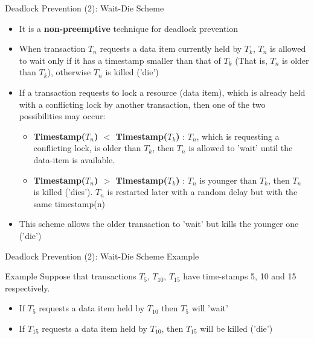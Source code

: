 \documentclass[aspectratio=169, xcolor=dvipsnames]{beamer}
\begin{document}
\begin{frame}{Deadlock Prevention (2): Wait-Die Scheme}
    \begin{itemize}[<+->]
        \item It is a \textbf{non-preemptive} technique for deadlock prevention
        \item When transaction $T_n$ requests a data item currently held by $T_k$, $T_n$ is allowed to wait only if it has a timestamp smaller than that of $T_k$ (That is, $T_n$ is older than $T_k$), otherwise $T_n$ is killed ('die')
        \item If a transaction requests to lock a resource (data item), which is already held with a conflicting lock by another transaction, then one of the two possibilities may occur:
        \begin{itemize}
            \item[$\triangleright$] \textbf{Timestamp($T_n$) $<$ Timestamp($T_k$)} : $T_n$, which is requesting a conflicting lock, is older than $T_k$, then $T_n$ is allowed to 'wait' until the data-item is available.
            \item[$\triangleright$] \textbf{Timestamp($T_n$) $>$ Timestamp($T_k$)} : $T_n$ is younger than $T_k$, then $T_n$ is killed ('dies'). $T_n$ is restarted later with a random delay but with the same timestamp(n)
        \end{itemize}
        \item This scheme allows the older transaction to 'wait' but kills the younger one ('die')
    \end{itemize}
\end{frame}

\begin{frame}{Deadlock Prevention (2): Wait-Die Scheme Example}
    \begin{exampleblock}{Example}
        Suppose that transactions $T_5$, $T_{10}$, $T_{15}$ have time-stamps 5, 10 and 15 respectively.
        \begin{itemize}
            \item If $T_5$ requests a data item held by $T_{10}$ then $T_5$ will 'wait'
            \item If $T_{15}$ requests a data item held by $T_{10}$, then $T_{15}$ will be killed ('die')
        \end{itemize}
    \end{exampleblock}
\end{frame}
\end{document}
